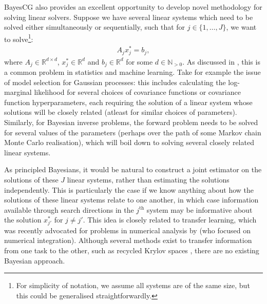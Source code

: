 \documentclass[twoside]{article}
\begin{document}
BayesCG also provides an excellent opportunity to develop novel methodology for solving linear solvers. Suppose we have several linear systems which need to be solved either simultaneously or sequentially, such that for $j \in \{1,\ldots,J\}$, we want to solve\footnote{For simplicity of notation, we assume all systems are of the same size, but this could be generalised straightforwardly.}:
\begin{align*}
A_j x_j^* =  b_j,  
\end{align*}
where $A_j \in \mathbb{R}^{d \times d}$, $x_j^* \in \mathbb{R}^d$ and $b_j \in \mathbb{R}^d$ for some $d \in \mathbb{N}_{> 0}$. As discussed in 
\cite{DeRoos2017}, this is a common problem in statistics and machine learning. Take for example the issue of model selection for Gaussian processes: this includes calculating the log-marginal likelihood for several choices of covariance functions or covariance function hyperparameters, each requiring the solution of a linear system whose solutions will be closely related (atleast for similar choices of parameters). Similarly, for Bayesian inverse problems, the forward problem needs to be solved for several values of the parameters (perhaps over the path of some Markov chain Monte Carlo realisation), which will boil down to solving several closely related linear systems.

As principled Bayesians, it would be natural to construct a joint estimator on the solutions of these $J$ linear systems, rather than estimating the solutions independently. This is particularly the case if we know anything about how the solutions of these linear systems relate to one another, in which case information available through search directions in the $j^{\text{th}}$ system may be informative about the solution $x^*_{j'}$ for $j \neq j'$. This idea is closely related to transfer learning, which was recently advocated for problems in numerical analysis by \cite{Xi2018MultiOutput} (who focused on numerical integration). Although several methods exist to transfer information from one task to the other, such as recycled Krylov spaces \citep{DeRoos2017}, there are no existing Bayesian approach. 
\end{document}

